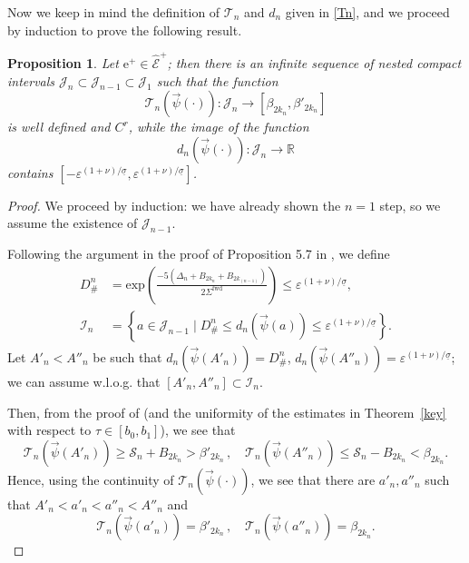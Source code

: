 \documentclass[10pt]{article}
\numberwithin{equation}{section}
\def\sTfwd{\Sigma^{\textrm{fwd}}}
\def\ep{\varepsilon}
\def\R{{\mathbb R}}
\def\ee{{\mathrm e}}
\def\EE{{\mathcal E}}
\def\SS{{\mathcal S}}
\def\TTT{\mathscr{T}}
\newtheorem{proposition}[theorem]{Proposition}
\theoremstyle{definition}
\theoremstyle{remark}
\begin{document}
Now we keep  in mind the definition of $\TTT_n$ and $d_n$ given in \eqref{Tn}, and  we proceed by induction
to prove the following result.
\begin{proposition}\label{inductionbis}
Let $\ee^+ \in \hat{\EE}^+$; then
there is an infinite sequence of nested compact intervals  $\mathcal{J}_{n} \subset\mathcal{J}_{n-1} \subset \mathcal{J}_1$
  such that the function
$$ \TTT_{n}(\vec{\psi}(\cdot)): \mathcal{J}_{n} \to  [\beta_{2k_n}, \beta'_{2k_n}]$$
is well defined and $C^r$, while  the image of the function
$$ d_{n}(\vec{\psi}(\cdot)): \mathcal{J}_{n} \to  \R$$
contains $[-\ep^{(1+\nu)/ \underline{\sigma}} , \ep^{(1+\nu)/ \underline{\sigma}}]$.
  \end{proposition}
\begin{proof}
We proceed by induction: we have already shown the $n=1$ step, so we assume the existence of $\mathcal{J}_{n-1}$.


Following the argument in the proof of Proposition 5.7  in \cite{CFPrestate}, we define
\begin{equation*}
\begin{split}
  D^n_\# &= \textrm{exp}\left(\frac{-5 (\Delta_n+B_{2k_n}+B_{2k_{(n-1)}}) }{2\sTfwd}\right) \le \ep^{(1+\nu)/ \underline{\sigma}},   \\
      \mathcal{I}_n &=
  \left\{ a \in \mathcal{J}_{n-1} \mid  D^n_\# \le d_{n}(\vec{\psi}(a))    \le \ep^{(1+\nu)/ \underline{\sigma}} \right\}.
  \end{split}
\end{equation*}
  Let   $A'_n<A''_n$  be such that
 $ d_n(\vec{\psi}(A'_n))=D_\#^n$, $d_n(\vec{\psi}(A''_n))=\ep^{(1+\nu)/ \underline{\sigma}}$; we can assume w.l.o.g. that $[A'_n,A''_n]
 \subset
\mathcal{I}_n$.

Then, from the proof of \cite[Lemma 5.8]{CFPrestate}  (and the uniformity of the estimates in
Theorem~\ref{key} with respect to $\tau \in [b_0,b_1]$), we see that
$$ \TTT_n(\vec{\psi}(A'_n)) \ge \SS_n +B_{2k_n}> \beta'_{2k_n} \,, \quad  \TTT_n(\vec{\psi}(A''_n)) \le \SS_n -B_{2k_n}<\beta_{2k_n}.$$
Hence, using the continuity of $\TTT_n(\vec{\psi}(\cdot))$, we see that there are $a'_n, a''_n$
such that $A'_n<a'_n<a''_n<A''_n$ and
\begin{equation}\label{hh}
   \TTT_n(\vec{\psi}(a'_n)) = \beta'_{2k_n} \,, \quad  \TTT_n(\vec{\psi}(a''_n)) = \beta_{2k_n}.
\end{equation}




\end{proof}
\end{document}
